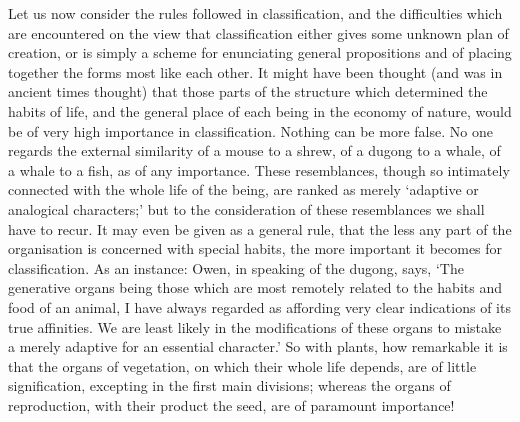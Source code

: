 \indent Let us now consider the rules followed in classification, and the difficulties which are encountered on the view that classification either gives some unknown plan of creation, or is simply a scheme for enunciating general propositions and of placing together the forms most like each other. It might have been thought (and was in ancient times thought) that those parts of the structure which determined the habits of life, and the general place of each being in the economy of nature, would be of very high importance in classification. Nothing can be more false. No one regards the external similarity of a mouse to a shrew, of a dugong to a whale, of a whale to a fish, as of any importance. These resemblances, though so intimately connected with the whole life of the being, are ranked as merely `adaptive or analogical characters;' but to the consideration of these resemblances we shall have to recur. It may even be given as a general rule, that the less any part of the organisation is concerned with special habits, the more important it becomes for classification. As an instance: Owen, in speaking of the dugong, says, `The generative organs being those which are most remotely related to the habits and food of an animal, I have always regarded as affording very clear indications of its true affinities. We are least likely in the modifications of these organs to mistake a merely adaptive for an essential character.' So with plants, how remarkable it is that the organs of vegetation, on which their whole life depends, are of little signification, excepting in the first main divisions; whereas the organs of reproduction, with their product the seed, are of paramount importance!~\\
